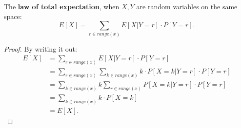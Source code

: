 \documentclass[a4paper]{article}
\begin{document}
 \begin{definition}
   The \textbf{law of total expectation}, when $X,Y$ are random variables on the same space:
    \[
      E[X] = \sum_{r \in range(x)} E[X|Y=r] \cdot P[Y=r]
   .\] 
   \begin{proof}
     By writing it out:
     \begin{align*}
       E[X] &= \sum_{r \in range(x)} E[X|Y=r] \cdot P[Y=r] \\
            &= \sum_{r \in range(x)} \sum_{k \in range(x)} k \cdot P[X=k|Y=r] \cdot P[Y=r]  \\
            &= \sum_{k \in range(x)} k \sum_{r \in range(x)}  P[X=k|Y=r] \cdot P[Y=r] \\
            &= \sum_{k \in range(x)} k \cdot P[X=k] \\
            &= E[X]
     .\end{align*}
   \end{proof}
 \end{definition}
\end{document}
